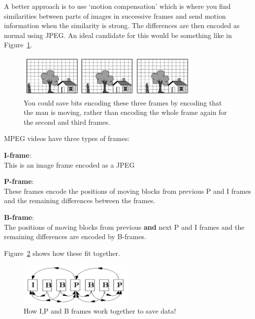 A better approach is to use `motion compensation' which is where you find
similarities between parts of images in successive frames and send motion
information when the similarity is strong. The differences are then encoded as
normal using JPEG. An ideal candidate for this would be something like in
Figure~\ref{move-man}.

\begin{figure}
  \centering
  \includegraphics[width=0.8\textwidth]{images/move-man}
  \caption{You could save bits encoding these three frames by encoding that
  the man is moving, rather than encoding the whole frame again for the second
  and third frames.}
  \label{move-man}
\end{figure}

MPEG videos have three types of frames:

\begin{description}
  \item \textbf{I-frame}:\\
    This is an image frame encoded as a JPEG
  \item \textbf{P-frame}:\\
    These frames encode the positions of moving blocks from previous P and I
    frames and the remaining differences between the frames.
  \item \textbf{B-frame}:\\
    The positions of moving blocks from previous \textbf{and} next P and I
    frames and the remaining differences are encoded by B-frames.
\end{description}

Figure~\ref{frames} shows how these fit together.

\begin{figure}
  \centering
  \includegraphics[width=0.5\textwidth]{images/frames}
  \caption{How I,P and B frames work together to save data!}
  \label{frames}
\end{figure}

